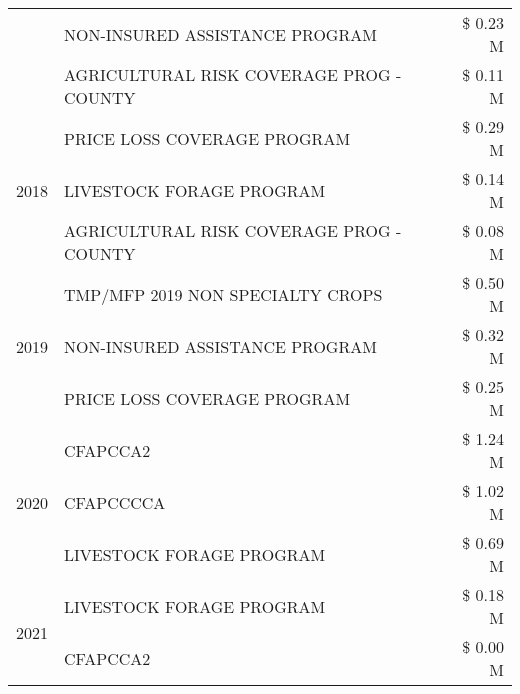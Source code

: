 \begin{tabular}{llr}
 & NON-INSURED ASSISTANCE PROGRAM & \$ 0.23 M \\
 & AGRICULTURAL RISK COVERAGE PROG - COUNTY & \$ 0.11 M \\
\cline{1-3}
\multirow[t]{3}{*}{2018} & PRICE LOSS COVERAGE PROGRAM & \$ 0.29 M \\
 & LIVESTOCK FORAGE PROGRAM & \$ 0.14 M \\
 & AGRICULTURAL RISK COVERAGE PROG - COUNTY & \$ 0.08 M \\
\cline{1-3}
\multirow[t]{3}{*}{2019} & TMP/MFP 2019 NON SPECIALTY CROPS & \$ 0.50 M \\
 & NON-INSURED ASSISTANCE PROGRAM & \$ 0.32 M \\
 & PRICE LOSS COVERAGE PROGRAM & \$ 0.25 M \\
\cline{1-3}
\multirow[t]{3}{*}{2020} & CFAPCCA2 & \$ 1.24 M \\
 & CFAPCCCCA & \$ 1.02 M \\
 & LIVESTOCK FORAGE PROGRAM & \$ 0.69 M \\
\cline{1-3}
\multirow[t]{2}{*}{2021} & LIVESTOCK FORAGE PROGRAM & \$ 0.18 M \\
 & CFAPCCA2 & \$ 0.00 M \\
\cline{1-3}
\bottomrule
\end{tabular}
